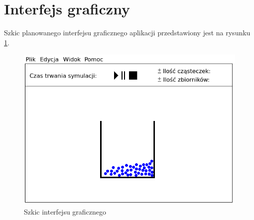 
\section{Interfejs graficzny}
Szkic planowanego interfejsu graficznego aplikacji przedstawiony jest na rysunku \ref{fig:szkic_interfejsu}.

\begin{figure}[H]
 \begin{center} 
  \includegraphics[width=\textwidth] {rysunki/ekran.png} 
 \end{center}
 \caption{Szkic interfejsu graficznego}
 \label{fig:szkic_interfejsu} 
\end{figure} 